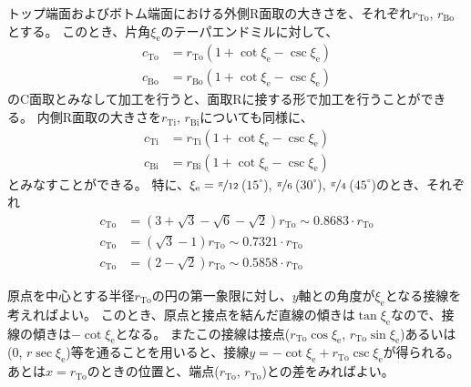 トップ端面およびボトム端面における外側R面取の大きさを、それぞれ$r_\mathrm{To}$, $r_\mathrm{Bo}$とする。
このとき、片角$\xi_\mathrm e$のテーパエンドミルに対して、
\begin{align*}
  c_\mathrm{To} &= r_\mathrm{To}\left(1+\cot\xi_\mathrm e-\csc\xi_\mathrm e\right)\\
  c_\mathrm{Bo} &= r_\mathrm{Bo}\left(1+\cot\xi_\mathrm e-\csc\xi_\mathrm e\right)
\end{align*}
のC面取とみなして加工を行うと、面取Rに接する形で加工を行うことができる。
内側R面取の大きさを$r_\mathrm{Ti}$, $r_\mathrm{Bi}$についても同様に、
\begin{align*}
  c_\mathrm{Ti} &= r_\mathrm{Ti}\left(1+\cot\xi_\mathrm e-\csc\xi_\mathrm e\right)\\
  c_\mathrm{Bi} &= r_\mathrm{Bi}\left(1+\cot\xi_\mathrm e-\csc\xi_\mathrm e\right)
\end{align*}
とみなすことができる。
特に、$\xi_\mathrm e = \nicefrac\pi{12}$\,($15^\circ$), $\nicefrac\pi6$\,($30^\circ$), $\nicefrac\pi4$\,($45^\circ$)のとき、それぞれ
\begin{align*}
  c_\mathrm{To} &= \left(3+\sqrt3-\sqrt6-\sqrt2\right)r_\mathrm{To} \sim 0.8683\cdot r_\mathrm{To}\\
  c_\mathrm{To} &= \left(\sqrt3-1\right)r_\mathrm{To} \sim 0.7321\cdot r_\mathrm{To}\\
  c_\mathrm{To} &= \left(2-\sqrt2\right)r_\mathrm{To} \sim 0.5858\cdot r_\mathrm{To}
\end{align*}
\begin{hosoku}
原点を中心とする半径$r_\mathrm{To}$の円の第一象限に対し、$y$軸との角度が$\xi_\mathrm e$となる接線を考えればよい。
このとき、原点と接点を結んだ直線の傾きは$\tan\xi_\mathrm e$なので、接線の傾きは$-\cot\xi_\mathrm e$となる。
またこの接線は接点($r_\mathrm{To}\cos\xi_\mathrm e$, $r_\mathrm{To}\sin\xi_\mathrm e$)あるいは(0, $r\sec\xi_\mathrm e$)等を通ることを用いると、接線$y = -\cot\xi_\mathrm e+r_\mathrm{To}\csc\xi_\mathrm e$が得られる。
あとは$x = r_\mathrm{To}$のときの位置と、端点($r_\mathrm{To}$, $r_\mathrm{To}$)との差をみればよい。
\end{hosoku}



